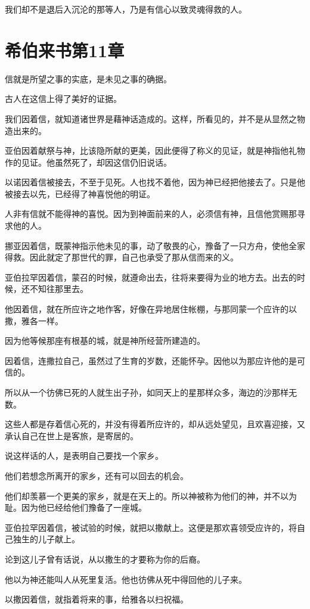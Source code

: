 \documentclass[12pt,oneside]{book}
\begin{document}
我们却不是退后入沉沦的那等人，乃是有信心以致灵魂得救的人。

\chapter{希伯来书第11章}
信就是所望之事的实底，是未见之事的确据。

古人在这信上得了美好的证据。

我们因着信，就知道诸世界是藉神话造成的。这样，所看见的，并不是从显然之物造出来的。

亚伯因着献祭与神，比该隐所献的更美，因此便得了称义的见证，就是神指他礼物作的见证。他虽然死了，却因这信仍旧说话。

以诺因着信被接去，不至于见死。人也找不着他，因为神已经把他接去了。只是他被接去以先，已经得了神喜悦他的明证。

人非有信就不能得神的喜悦。因为到神面前来的人，必须信有神，且信他赏赐那寻求他的人。

挪亚因着信，既蒙神指示他未见的事，动了敬畏的心，豫备了一只方舟，使他全家得救。因此就定了那世代的罪，自己也承受了那从信而来的义。

亚伯拉罕因着信，蒙召的时候，就遵命出去，往将来要得为业的地方去。出去的时候，还不知往那里去。

他因着信，就在所应许之地作客，好像在异地居住帐棚，与那同蒙一个应许的以撒，雅各一样。

因为他等候那座有根基的城，就是神所经营所建造的。

因着信，连撒拉自己，虽然过了生育的岁数，还能怀孕。因他以为那应许他的是可信的。

所以从一个彷佛已死的人就生出子孙，如同天上的星那样众多，海边的沙那样无数。

这些人都是存着信心死的，并没有得着所应许的，却从远处望见，且欢喜迎接，又承认自己在世上是客旅，是寄居的。

说这样话的人，是表明自己要找一个家乡。

他们若想念所离开的家乡，还有可以回去的机会。

他们却羡慕一个更美的家乡，就是在天上的。所以神被称为他们的神，并不以为耻。因为他已经给他们豫备了一座城。

亚伯拉罕因着信，被试验的时候，就把以撒献上。这便是那欢喜领受应许的，将自己独生的儿子献上。

论到这儿子曾有话说，从以撒生的才要称为你的后裔。

他以为神还能叫人从死里复活。他也彷佛从死中得回他的儿子来。

以撒因着信，就指着将来的事，给雅各以扫祝福。
\end{document}
